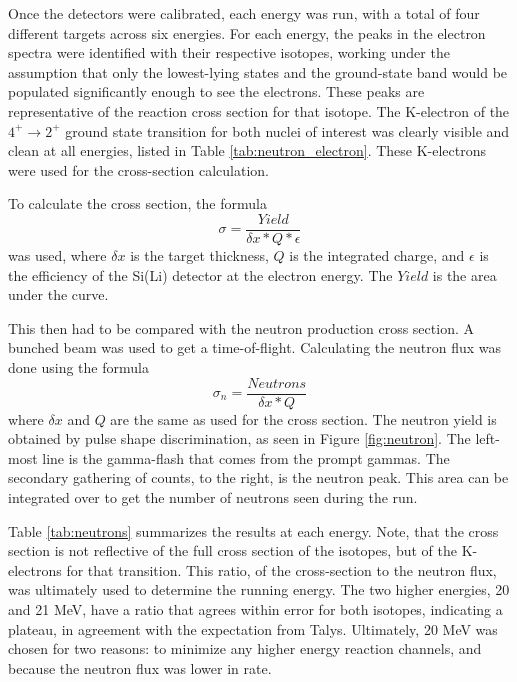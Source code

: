 Once the detectors were calibrated, each energy was run, with a total of four different targets across six energies. For each energy, the peaks in the electron spectra were identified with their respective isotopes, working under the assumption that only the lowest-lying states and the ground-state band would be populated significantly enough to see the electrons. These peaks are representative of the reaction cross section for that isotope. The K-electron of the $4^+\rightarrow2^+$ ground state transition for both nuclei of interest was clearly visible and clean at all energies, listed in Table \ref{tab:neutron_electron}. These K-electrons were used for the cross-section calculation.



To calculate the cross section, the formula
\begin{equation}
    \sigma=\frac{Yield}{\delta x*Q*\epsilon}
    \label{eq:xs}
\end{equation}
was used, where $\delta x$ is the target thickness, $Q$ is the integrated charge, and $\epsilon$ is the efficiency of the Si(Li) detector at the electron energy. The $Yield$ is the area under the curve.

This then had to be compared with the neutron production cross section. A bunched beam was used to get a time-of-flight. Calculating the neutron flux was done using the formula
\begin{equation}
    \sigma_n = \frac{Neutrons}{\delta x*Q}
\end{equation}
where $\delta x$ and $Q$ are the same as used for the cross section. The neutron yield is obtained by pulse shape discrimination, as seen in Figure \ref{fig:neutron}. The left-most line is the gamma-flash that comes from the prompt gammas. The secondary gathering of counts, to the right, is the neutron peak. This area can be integrated over to get the number of neutrons seen during the run.

Table \ref{tab:neutrons} summarizes the results at each energy. Note, that the cross section is not reflective of the full cross section of the isotopes, but of the K-electrons for that transition. This ratio, of the cross-section to the neutron flux, was ultimately used to determine the running energy. The two higher energies, 20 and 21 MeV, have a ratio that agrees within error for both isotopes, indicating a plateau, in agreement with the expectation from Talys. Ultimately, 20 MeV was chosen for two reasons: to minimize any higher energy reaction channels, and because the neutron flux was lower in rate.

